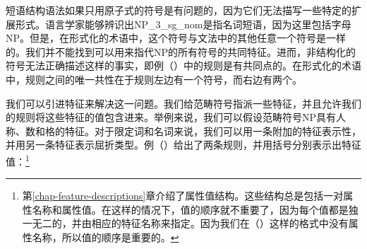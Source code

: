 短语结构语法如果只用原子式的符号是有问题的，因为它们无法描写一些特定的扩展形式。语言学家能够辨识出NP\_3\_sg\_nom是指名词短语，因为这里包括字母NP。但是，在形式化的术语中，这个符号与文法中的其他任意一个符号是一样的。我们并不能找到可以用来指代NP的所有符号的共同特征。进而，非结构化的符号无法正确描述这样的事实，即例（）中的规则是有共同点的。在形式化的术语中，规则之间的唯一共性在于规则左边有一个符号，而右边有两个。

我们可以引进特征来解决这一问题。我们给范畴符号指派一些特征，并且允许我们的规则将这些特征的值包含进来。举例来说，我们可以假设范畴符号NP具有人称、数和格的特征。对于限定词和名词来说，我们可以用一条附加的特征表示性，并用另一条特征表示屈折类型。例（）给出了两条规则，并用括号分别表示出特征值：\footnote{%
第\ref{chap-feature-descriptions}章介绍了属性值结构。这些结构总是包括一对属性名称和属性值。在这样的情况下，值的顺序就不重要了，因为每个值都是独一无二的，并由相应的特征名称来指定。因为我们在（）这样的格式中没有属性名称，所以值的顺序是重要的。
}

